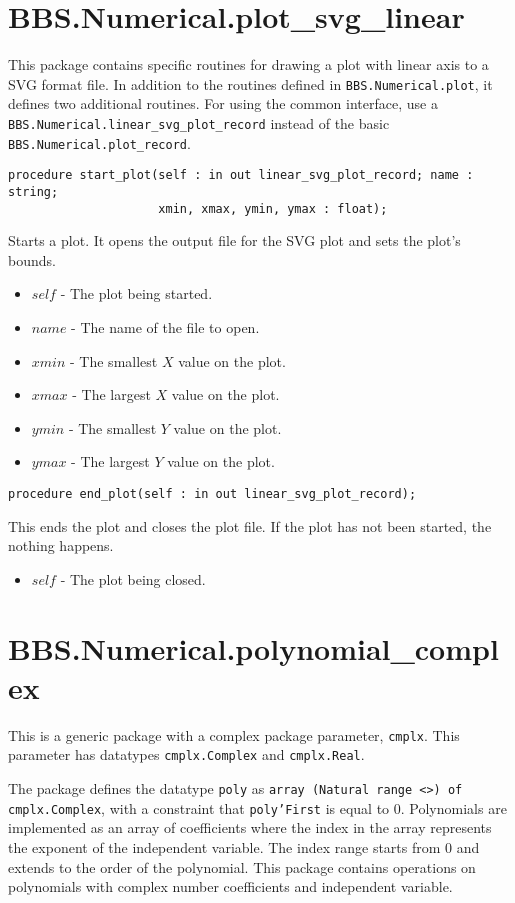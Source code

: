 \documentclass[10pt, openany]{book}
\newcommand{\package}[1]{\texttt{#1}}
\newcommand{\datatype}[1]{\texttt{#1}}
\begin{document}
\section{BBS.Numerical.plot\_svg\_linear}
This package contains specific routines for drawing a plot with linear axis to a SVG format file.  In addition to the routines defined in \package{BBS.Numerical.plot}, it defines two additional routines.  For using the common interface, use a \datatype{BBS.Numerical.linear\_svg\_plot\_record} instead of the basic \datatype{BBS.Numerical.plot\_record}.
\begin{lstlisting}
procedure start_plot(self : in out linear_svg_plot_record; name : string;
                     xmin, xmax, ymin, ymax : float);
\end{lstlisting}
Starts a plot.  It opens the output file for the SVG plot and sets the plot's bounds.
\begin{itemize}
  \item $self$ - The plot being started.
  \item $name$ - The name of the file to open.
  \item $xmin$ - The smallest $X$ value on the plot.
  \item $xmax$ - The largest $X$ value on the plot.
  \item $ymin$ - The smallest $Y$ value on the plot.
  \item $ymax$ - The largest $Y$ value on the plot.
\end{itemize}
\begin{lstlisting}
procedure end_plot(self : in out linear_svg_plot_record);
\end{lstlisting}
This ends the plot and closes the plot file.  If the plot has not been started, the nothing happens.
\begin{itemize}
  \item $self$ - The plot being closed.
\end{itemize}

\section{BBS.Numerical.polynomial\_complex}
This is a generic package with a complex package parameter, \datatype{cmplx}.  This parameter has datatypes \datatype{cmplx.Complex} and \datatype{cmplx.Real}.

The package defines the datatype \datatype{poly} as \datatype{array (Natural range  <>) of cmplx.Complex}, with a constraint that \datatype{poly'First} is equal to 0.  Polynomials are implemented as an array of coefficients where the index in the array represents the exponent of the independent variable.  The index range starts from 0 and extends to the order of the polynomial.  This package contains operations on polynomials with complex number coefficients and independent variable.
\end{document}
